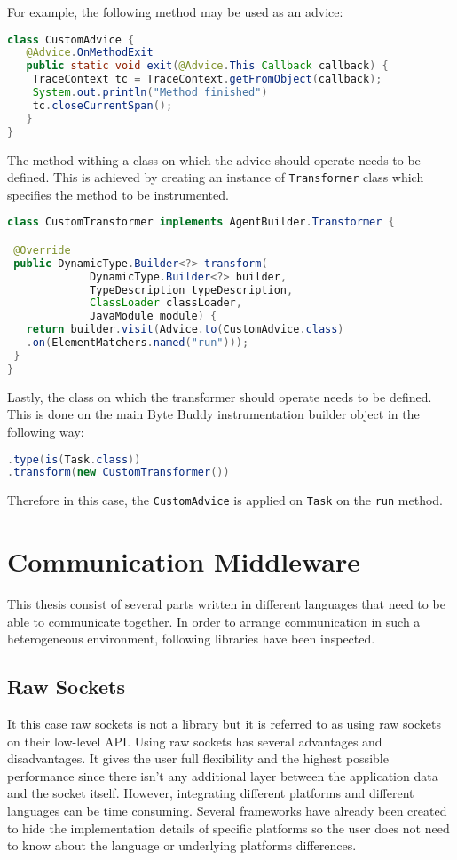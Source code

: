 For example, the following method may be used as an advice: 
\begin{lstlisting}[language=Java]
class CustomAdvice {
   @Advice.OnMethodExit
   public static void exit(@Advice.This Callback callback) {
   	TraceContext tc = TraceContext.getFromObject(callback);
   	System.out.println("Method finished")
   	tc.closeCurrentSpan();
   }
}   
\end{lstlisting}

The method withing a class on which the advice should operate needs to be defined. This is achieved by creating an instance of \texttt{Transformer} class which specifies the method to be instrumented.

\begin{lstlisting}[language=Java]
class CustomTransformer implements AgentBuilder.Transformer {

 @Override
 public DynamicType.Builder<?> transform(
			 DynamicType.Builder<?> builder,
			 TypeDescription typeDescription,
			 ClassLoader classLoader,
			 JavaModule module) {
   return builder.visit(Advice.to(CustomAdvice.class)
   .on(ElementMatchers.named("run")));
 }
}
\end{lstlisting}

Lastly, the class on which the transformer should operate needs to be defined. This is done on the main Byte Buddy instrumentation builder object in the following way:

\begin{lstlisting}[language=Java]
.type(is(Task.class))
.transform(new CustomTransformer())
\end{lstlisting}

Therefore in this case, the \texttt{CustomAdvice} is applied on \texttt{Task} on the \texttt{run} method.
\section{Communication Middleware}
This thesis consist of several parts written in different languages that need to be able to communicate together. In order to arrange communication in such a heterogeneous environment, following libraries have been inspected.
\subsection{Raw Sockets}
\label{raw_sockets}
It this case raw sockets is not a library but it is referred to as using raw sockets on their low-level API. Using raw sockets has several advantages and disadvantages. It gives the user full flexibility and the highest possible performance since there isn't any additional layer between the application data and the socket itself. However, integrating different platforms and different languages can be time consuming. Several frameworks have already been created to hide the implementation details of specific platforms so the user does not need to know about the language or underlying platforms differences.

